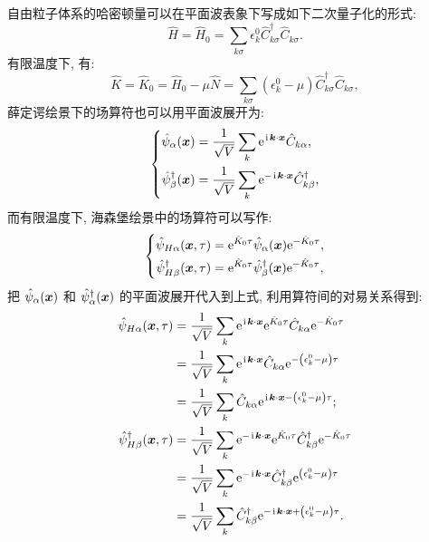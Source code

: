 自由粒子体系的哈密顿量可以在平面波表象下写成如下二次量子化的形式:
\begin{equation}
\hat{H}=\hat{H}_0=\sum_{k \sigma} \epsilon_k^0 \hat{C}_{k \sigma}^{\dagger} \hat{C}^{}_{k \sigma}.
\end{equation}
有限温度下, 有:
\begin{equation}
\hat{K}=\hat{K}_0=\hat{H}_0-\mu \hat{N}=\sum_{k \sigma}\left(\epsilon_k^0-\mu\right) \hat{C}_{k \sigma}^{\dagger} \hat{C}^{}_{k \sigma},
\end{equation}
薛定谔绘景下的场算符也可以用平面波展开为:
\begin{equation}
\left\{\begin{aligned}
\hat{\psi}_\alpha(\boldsymbol{x})&=\frac{1}{\sqrt{V}} \sum_k \mathrm{e}^{\hspace{0.1em}\mathrm{i}\hspace{0.1em} \boldsymbol{k} \cdot \boldsymbol{x}} \hat{C}_{k \alpha}, \\
\hat{\psi}_\beta^{\dagger}(\boldsymbol{x})&=\frac{1}{\sqrt{V}} \sum_k \mathrm{e}^{-\hspace{0.1em}\mathrm{i}\hspace{0.1em} \boldsymbol{k} \cdot \boldsymbol{x}} \hat{C}_{k \beta}^{\dagger},
\end{aligned}\right.
\end{equation}
而有限温度下, 海森堡绘景中的场算符可以写作:
\begin{equation}
\left\{\begin{aligned}
\hat{\psi}_{H \alpha}(\boldsymbol{x}, \tau)&=\mathrm{e}^{\hat{K}_0 \tau} \hat{\psi}_\alpha(\boldsymbol{x}) \mathrm{e}^{-\hat{K}_0 \tau}, \\
\hat{\psi}_{H \beta}^{\dagger}(\boldsymbol{x}, \tau)&=\mathrm{e}^{\hat{K}_0 \tau} \hat{\psi}_\beta^{\dagger}(\boldsymbol{x}) \mathrm{e}^{-\hat{K}_0 \tau},
\end{aligned}\right.
\end{equation}
把 $\hat{\psi}_\alpha(\boldsymbol{x})$ 和 $\hat{\psi}_\alpha^{\dagger}(\boldsymbol{x})$ 的平面波展开代入到上式, 利用算符间的对易关系得到:
\begin{align}
\hat{\psi}_{H \alpha}(\boldsymbol{x}, \tau)&=\frac{1}{\sqrt{V}} \sum_k \mathrm{e}^{\hspace{0.1em}\mathrm{i}\hspace{0.1em} \boldsymbol{k} \cdot \boldsymbol{x}} \mathrm{e}^{\hat{K}_0 \tau} \hat{C}_{k \alpha} \mathrm{e}^{-\hat{K}_0 \tau}\nonumber\\
&=\frac{1}{\sqrt{V}} \sum_k \mathrm{e}^{\hspace{0.1em}\mathrm{i}\hspace{0.1em} \boldsymbol{k} \cdot \boldsymbol{x}} \hat{C}_{k \alpha} \mathrm{e}^{-\left(\epsilon_k^0-\mu\right) \tau} \nonumber\\
&=\frac{1}{\sqrt{V}} \sum_k  \hat{C}_{k \alpha} \mathrm{e}^{\hspace{0.1em}\mathrm{i}\hspace{0.1em} \boldsymbol{k} \cdot \boldsymbol{x}-\left(\epsilon_k^0-\mu\right) \tau};\\
\hat{\psi}_{H \beta}^{\dagger}(\boldsymbol{x}, \tau)&=\frac{1}{\sqrt{V}} \sum_k \mathrm{e}^{-\hspace{0.1em}\mathrm{i}\hspace{0.1em} \boldsymbol{k} \cdot \boldsymbol{x}} \mathrm{e}^{\hat{K}_0 \tau} \hat{C}_{k \beta}^{\dagger} \mathrm{e}^{-\hat{K}_0 \tau}\nonumber\\
&=\frac{1}{\sqrt{V}} \sum_k \mathrm{e}^{-\hspace{0.1em}\mathrm{i}\hspace{0.1em} \boldsymbol{k} \cdot \boldsymbol{x}} \hat{C}_{k \beta}^{\dagger} \mathrm{e}^{\left(\epsilon_k^0-\mu\right) \tau}\nonumber\\
&=\frac{1}{\sqrt{V}} \sum_k  \hat{C}_{k \beta}^{\dagger} \mathrm{e}^{-\hspace{0.1em}\mathrm{i}\hspace{0.1em} \boldsymbol{k} \cdot \boldsymbol{x}+\left(\epsilon_k^0-\mu\right) \tau} .
\end{align}

